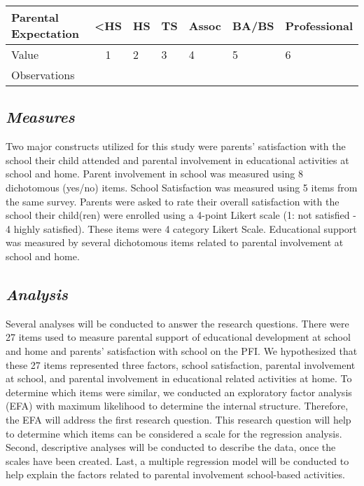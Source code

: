 \documentclass[
]{article}
\begin{document}
\begin{longtable}[]{@{}lclllll@{}}
\toprule
Parental Expectation & \textless HS & HS & TS & Assoc & BA/BS &
Professional\tabularnewline
\midrule
\endhead
Value & 1 & 2 & 3 & 4 & 5 & 6\tabularnewline
Observations & & & & & &\tabularnewline
\bottomrule
\end{longtable}

\hypertarget{measures}{%
\subsection{\texorpdfstring{\textbf{\emph{Measures}}}{Measures}}\label{measures}}

Two major constructs utilized for this study were parents' satisfaction
with the school their child attended and parental involvement in
educational activities at school and home. Parent involvement in school
was measured using 8 dichotomous (yes/no) items. School Satisfaction was
measured using 5 items from the same survey. Parents were asked to rate
their overall satisfaction with the school their child(ren) were
enrolled using a 4-point Likert scale (1: not satisfied - 4 highly
satisfied). These items were 4 category Likert Scale. Educational
support was measured by several dichotomous items related to parental
involvement at school and home.

\hypertarget{analysis}{%
\subsection{\texorpdfstring{\textbf{\emph{Analysis}}}{Analysis}}\label{analysis}}

Several analyses will be conducted to answer the research questions.
There were 27 items used to measure parental support of educational
development at school and home and parents' satisfaction with school on
the PFI. We hypothesized that these 27 items represented three factors,
school satisfaction, parental involvement at school, and parental
involvement in educational related activities at home. To determine
which items were similar, we conducted an exploratory factor analysis
(EFA) with maximum likelihood to determine the internal structure.
Therefore, the EFA will address the first research question. This
research question will help to determine which items can be considered a
scale for the regression analysis. Second, descriptive analyses will be
conducted to describe the data, once the scales have been created. Last,
a multiple regression model will be conducted to help explain the
factors related to parental involvement school-based activities.
\end{document}
